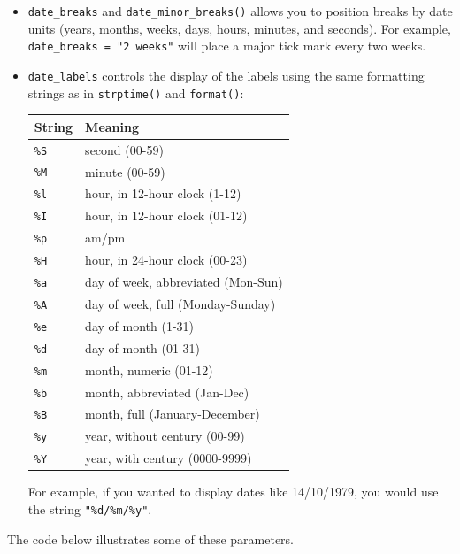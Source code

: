 \begin{itemize}
\item
  \texttt{date\_breaks} and \texttt{date\_minor\_breaks()} allows you to
  position breaks by date units (years, months, weeks, days, hours,
  minutes, and seconds). For example, \texttt{date\_breaks = "2 weeks"}
  will place a major tick mark every two weeks.
\item
  \texttt{date\_labels} controls the display of the labels using the
  same formatting strings as in \texttt{strptime()} and
  \texttt{format()}:

  \begin{longtable}[c]{@{}ll@{}}
  \toprule
  String & Meaning\tabularnewline
  \midrule
  \endhead
  \texttt{\%S} & second (00-59)\tabularnewline
  \texttt{\%M} & minute (00-59)\tabularnewline
  \texttt{\%l} & hour, in 12-hour clock (1-12)\tabularnewline
  \texttt{\%I} & hour, in 12-hour clock (01-12)\tabularnewline
  \texttt{\%p} & am/pm\tabularnewline
  \texttt{\%H} & hour, in 24-hour clock (00-23)\tabularnewline
  \texttt{\%a} & day of week, abbreviated (Mon-Sun)\tabularnewline
  \texttt{\%A} & day of week, full (Monday-Sunday)\tabularnewline
  \texttt{\%e} & day of month (1-31)\tabularnewline
  \texttt{\%d} & day of month (01-31)\tabularnewline
  \texttt{\%m} & month, numeric (01-12)\tabularnewline
  \texttt{\%b} & month, abbreviated (Jan-Dec)\tabularnewline
  \texttt{\%B} & month, full (January-December)\tabularnewline
  \texttt{\%y} & year, without century (00-99)\tabularnewline
  \texttt{\%Y} & year, with century (0000-9999)\tabularnewline
  \bottomrule
  \end{longtable}

  For example, if you wanted to display dates like 14/10/1979, you would
  use the string \texttt{"\%d/\%m/\%y"}.
\end{itemize}

The code below illustrates some of these parameters.

\begin{Shaded}
\end{Shaded}

